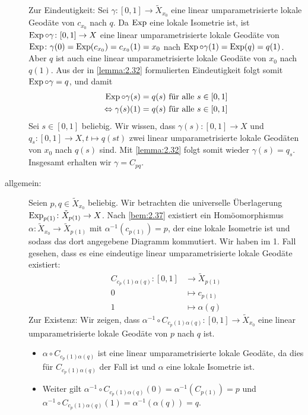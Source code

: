 \begin{beweis}
\begin{description}
		Zur Eindeutigkeit: Sei $\gamma\colon [0,1] \rightarrow \tilde{X}_{x_0}$ eine linear umparametrisierte lokale Geodäte von $c_{x_0}$ nach $q$.
		Da $\operatorname{Exp}$ eine lokale Isometrie ist, ist $\operatorname{Exp} \circ \gamma \colon [0,1] \rightarrow X$ eine linear umparametrisierte lokale Geodäte von $\operatorname{Exp} \colon \gamma(0) = \operatorname{Exp}(c_{x_0}) = c_{x_0}(1) = x_0$ nach $\operatorname{Exp} \circ \gamma(1) = \operatorname{Exp}(q) = q(1)$.
		Aber $q$ ist auch eine linear umparametrisierte lokale Geodäte von $x_0$ nach $q(1)$.
		Aus der in \autoref{lemma:2.32} formulierten Eindeutigkeit folgt somit $\operatorname{Exp} \circ \gamma = q$, und damit
		\begin{align*}
			\operatorname{Exp} \circ \gamma(s) &= q(s) \text{ für alle } s \in [0,1] \\
			\Leftrightarrow \gamma(s)(1) &= q(s) \text{ für alle } s \in [0,1]
		\end{align*}
		Sei $s \in [0,1]$ beliebig.
		Wir wissen, dass $\gamma(s) \colon [0,1] \rightarrow X$ und $ q_s\colon [0,1] \rightarrow X, t \mapsto q(st)$ zwei linear umparametrisierte lokale Geodäten von $x_0$ nach $q(s)$ sind.
		Mit \autoref{lemma:2.32} folgt somit wieder $\gamma(s) = q_s$.
		Insgesamt erhalten wir $\gamma = C_{pq}$.
		\item[allgemein:] Seien $p,q \in \tilde{X}_{x_0}$ beliebig.
		Wir betrachten die universelle Überlagerung $\operatorname{Exp}_{p(1)} \colon \tilde{X}_{p(1)} \rightarrow X$.
		Nach \autoref{bem:2.37} existiert ein Homöomorphismus $\alpha \colon \tilde{X}_{x_0} \rightarrow \tilde{X}_{p(1)}$ mit $\alpha^{-1}(c_{p(1)}) = p$, der eine lokale Isometrie ist und sodass das dort angegebene Diagramm kommutiert.
		Wir haben im 1. Fall gesehen, dass es eine eindeutige linear umparametrisierte lokale Geodäte existiert:
		\begin{align*}
			C_{c_p(1)\alpha(q)} \colon [0,1] &\longrightarrow \tilde{X}_{p(1)} \\
			0 &\longmapsto c_{p(1)} \\
			1 &\longmapsto \alpha(q)
		\end{align*}
		Zur Existenz:
		Wir zeigen, dass $\alpha^{-1} \circ C_{c_p(1)\alpha(q)}\colon [0,1] \rightarrow \tilde{X}_{x_0}$ eine linear umparametrisierte lokale Geodäte von $p$ nach $q$ ist.
		\begin{itemize}
			\item $\alpha \circ C_{c_p(1)\alpha(q)}$ ist eine linear umparametrisierte lokale Geodäte, da dies für $C_{c_p(1)\alpha(q)}$ der Fall ist und $\alpha$ eine lokale Isometrie ist.
			\item Weiter gilt $\alpha^{-1} \circ C_{c_p(1)\alpha(q)}(0) = \alpha^{-1}(C_{p(1)}) = p$ und $\alpha^{-1} \circ C_{c_p(1)\alpha(q)}(1) = \alpha^{-1}(\alpha(q)) = q$.
		\end{itemize}
		

\end{description}
\end{beweis}
